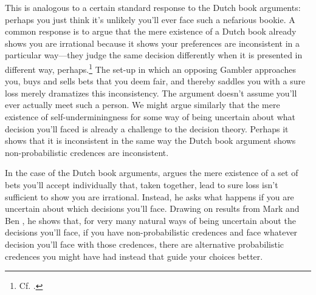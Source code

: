 \documentclass[a4paper]{article}
\newenvironment{CCM rewritten}
{\begingroup\color{blue}} %
{\endgroup}              %
\begin{document}
This is analogous to a certain standard response to the Dutch book arguments: perhaps you just think it's unlikely you'll ever face such a nefarious bookie. A common response is to argue that the mere existence of a Dutch book already shows you are irrational because it shows your preferences are inconsistent in a particular way---they judge the same decision differently when it is presented in different way, perhaps.\footnote{Cf. \citep{armendt1993db,mahtani2014db}.} %
{The set-up in which an opposing Gambler approaches you, buys and sells bets that you deem fair, and thereby saddles you with a sure loss merely dramatizes this inconsistency.} The argument doesn't assume you'll ever actually meet such a person. We might argue similarly that the mere existence of self-underminingness for some way of being uncertain about what decision you'll faced is already a challenge to the decision theory. Perhaps it shows that it is inconsistent in the same way the Dutch book argument shows non-probabilistic credences are inconsistent.

In the case of the Dutch book arguments,  argues the mere existence of a set of bets you'll accept individually that, taken together, lead to sure loss isn't sufficient to show you are  irrational. Instead, he asks what happens if you are uncertain about which decisions you'll face. Drawing on results from Mark \citet{schervish1989gm} and Ben \citet{levinstein2017pgeu}, he shows that, for very  many natural ways of being uncertain about the decisions you'll face, if you have non-probabilistic credences and face whatever decision you'll face with those credences, there are alternative probabilistic credences you might have had instead that guide your choices better.
\end{document}
